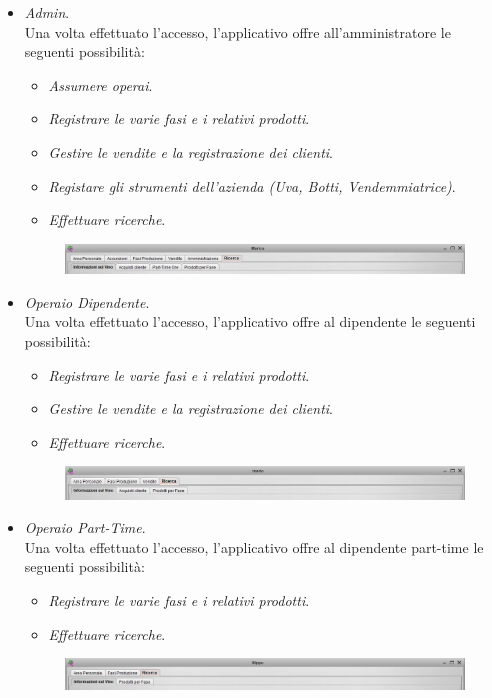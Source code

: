 \documentclass{article}
\begin{document}
\begin{itemize}
\item  \textit{Admin}.\\
Una volta effettuato l'accesso, l'applicativo offre all'amministratore le seguenti possibilità:
\begin{itemize}
\item  \textit{Assumere operai}.
\item  \textit{Registrare le varie fasi e i relativi prodotti}.
\item  \textit{Gestire le vendite e la registrazione dei clienti}.
\item  \textit{Registare gli strumenti dell'azienda (Uva, Botti, Vendemmiatrice)}.
\item  \textit{Effettuare ricerche}.
\end{itemize}
\begin{figure}[htbp]
\centering
\includegraphics[width=1\textwidth]{img/Panelli_Ricerca_Admin.png}
\end{figure}
\item  \textit{Operaio Dipendente}.\\
Una volta effettuato l'accesso, l'applicativo offre al dipendente le seguenti possibilità:
\begin{itemize}
\item  \textit{Registrare le varie fasi e i relativi prodotti}.
\item  \textit{Gestire le vendite e la registrazione dei clienti}.
\item  \textit{Effettuare ricerche}.
\end{itemize}
\begin{figure}[htbp]
\centering
\includegraphics[width=1\textwidth]{img/Panelli_Ricerca_Dip.png}
\end{figure}
\item  \textit{Operaio Part-Time}.\\
Una volta effettuato l'accesso, l'applicativo offre al dipendente part-time le seguenti possibilità:
\begin{itemize}
\item  \textit{Registrare le varie fasi e i relativi prodotti}.
\item  \textit{Effettuare ricerche}.
\end{itemize}
\begin{figure}[htbp]
\centering
\includegraphics[width=1\textwidth]{img/Panelli_Ricerca_Part.png}
\end{figure}
\end{itemize}
\newpage
\end{document}
